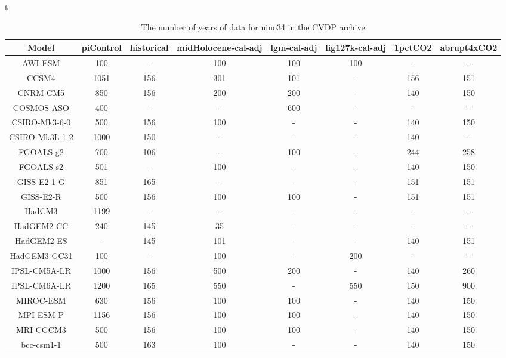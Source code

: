 \begin{table}{t}
\begin{tabular}{ c |  c | c | c | c | c | c | c  } 
\hline
Model&piControl&historical&midHolocene-cal-adj&lgm-cal-adj&lig127k-cal-adj&1pctCO2&abrupt4xCO2\\ \hline
AWI-ESM&100&-&100&100&100&-&-\\
CCSM4&1051&156&301&101&-&156&151\\
CNRM-CM5&850&156&200&200&-&140&150\\
COSMOS-ASO&400&-&-&600&-&-&-\\
CSIRO-Mk3-6-0&500&156&100&-&-&140&150\\
CSIRO-Mk3L-1-2&1000&150&-&-&-&140&-\\
FGOALS-g2&700&106&-&100&-&244&258\\
FGOALS-s2&501&-&100&-&-&140&150\\
GISS-E2-1-G&851&165&-&-&-&151&151\\
GISS-E2-R&500&156&100&100&-&151&151\\
HadCM3&1199&-&-&-&-&-&-\\
HadGEM2-CC&240&145&35&-&-&-&-\\
HadGEM2-ES&-&145&101&-&-&140&151\\
HadGEM3-GC31&100&-&100&-&200&-&-\\
IPSL-CM5A-LR&1000&156&500&200&-&140&260\\
IPSL-CM6A-LR&1200&165&550&-&550&150&900\\
MIROC-ESM&630&156&100&100&-&140&150\\
MPI-ESM-P&1156&156&100&100&-&140&150\\
MRI-CGCM3&500&156&100&100&-&140&150\\
bcc-csm1-1&500&163&100&-&-&140&150\\
\hline
\end{tabular}
\caption{The number of years of data for nino34 in the CVDP archive}
\end{table}
